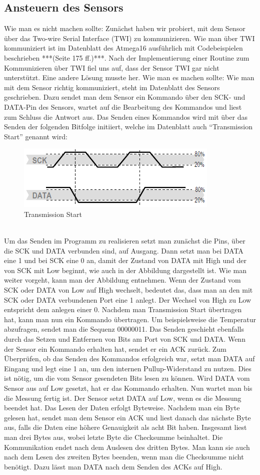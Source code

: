 \documentclass[]{article}
\begin{document}
\subsection{Ansteuern des Sensors}
Wie man es nicht machen sollte:
Zunächst haben wir probiert, mit dem Sensor über das Two-wire Serial Interface (TWI) zu kommunizieren. Wie man über TWI kommuniziert ist im Datenblatt des Atmega16 ausführlich mit Codebeispielen beschrieben ***(Seite 175 ff.)***. Nach der Implementierung einer Routine zum Kommunizieren über TWI fiel uns auf, dass der Sensor TWI gar nicht unterstützt. Eine andere Lösung musste her.
Wie man es machen sollte:
Wie man mit dem Sensor richtig kommuniziert, steht im Datenblatt des Sensors geschrieben. Dazu sendet man dem Sensor ein Kommando über den SCK- und DATA-Pin des Sensors, wartet auf die Bearbeitung des Kommandos und liest zum Schluss die Antwort aus. 
Das Senden eines Kommandos wird mit über das Senden der folgenden Bitfolge initiiert, welche im Datenblatt auch "`Transmission Start"' genannt wird: 
\begin{figure}[h]
	\centering
	\includegraphics[width=0.5\columnwidth]{transmission_start.png}
	\caption{Transmission Start}
\end{figure}
\\ Um das Senden im Programm zu realisieren setzt man zunächst die Pins, über die SCK und DATA verbunden sind, auf Ausgang. Dann setzt man bei DATA eine 1 und bei SCK eine 0 an, damit der Zustand von DATA mit High und der von SCK mit Low beginnt, wie auch in der Abbildung dargestellt ist. Wie man weiter vorgeht, kann man der Abbildung entnehmen. Wenn der Zustand vom SCK oder DATA von Low auf High wechselt, bedeutet das, dass man an den mit SCK oder DATA verbundenen Port eine 1 anlegt. Der Wechsel von High zu Low entspricht dem anlegen einer 0. Nachdem man Transmission Start übertragen hat, kann man nun ein Kommando übertragen. Um beispielsweise die Temperatur abzufragen, sendet man die Sequenz 00000011. Das Senden geschieht ebenfalls durch das Setzen und Entfernen von Bits am Port von SCK und DATA. Wenn der Sensor ein Kommando erhalten hat, sendet er ein ACK zurück. Zum Überprüfen, ob das Senden des Kommandos erfolgreich war, setzt man DATA auf Eingang und legt eine 1 an, um den internen Pullup-Widerstand zu nutzen. Dies ist nötig, um die vom Sensor gesendeten Bits lesen zu können. Wird DATA vom Sensor aus auf Low gesetzt, hat er das Kommando erhalten. Nun wartet man bis die Messung fertig ist. Der Sensor setzt DATA auf Low, wenn es die Messung beendet hat. Das Lesen der Daten erfolgt Byteweise. Nachdem man ein Byte gelesen hat, sendet man dem Sensor ein ACK und liest danach das nächste Byte aus, falls die Daten eine höhere Genauigkeit als acht Bit haben. Insgesamt liest man drei Bytes aus, wobei letzte Byte die Checksumme beinhaltet. Die Kommunikation endet nach dem Auslesen des dritten Bytes. Man kann sie auch nach dem Lesen des zweiten Bytes beenden, wenn man die Checksumme nicht benötigt. Dazu lässt man DATA nach dem Senden des ACKs auf High. 
\end{document}
